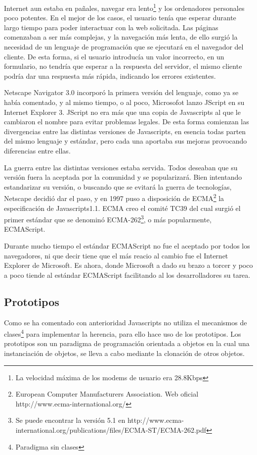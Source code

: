 Internet aun estaba en pañales, navegar era lento\footnote{La velocidad máxima de los modems de
  usuario era 28.8Kbps} y los ordenadores personales poco potentes. En el mejor de los casos, el
usuario tenía que esperar durante largo tiempo para poder interactuar con la web solicitada.  Las
páginas comenzaban a ser más complejas, y la navegación más lenta, de ello surgió la necesidad de
un lenguaje de programación que se ejecutará en el navegador del cliente. De esta forma, si el
usuario introducía un valor incorrecto, en un formulario, no tendría que esperar a la respuesta del
servidor, el mismo cliente podría dar una respuesta más rápida, indicando los errores existentes.

Netscape Navigator 3.0 incorporó la primera versión del lenguaje, como ya se había comentado, y al
mismo tiempo, o al poco, Microsofot lanzo JScript en su Internet Explorer 3. JScript no era más que 
una copia de Javascripts al que le cambiaron el nombre para evitar problemas legales. De esta
forma comienzan las divergencias entre las distintas versiones de Javascripts, en esencia todas
parten del mismo lenguaje y estándar, pero cada una aportaba sus mejoras provocando diferencias
entre ellas. 

La guerra entre las distintas versiones estaba servida. Todos deseaban que su versión fuera la
aceptada por la comunidad y se popularizará. Bien intentando estandarizar su versión, o buscando
que se evitará la guerra de tecnologías, Netscape decidió dar el paso, y en 1997 puso a disposición
de ECMA\footnote{European Computer Manufacturers Association. Web oficial
  http://www.ecma-international.org/} la especificación de Javascripts1.1. ECMA creo el comité TC39
del cual surgió el primer estándar que se denominó ECMA-262\footnote{Se puede encontrar la versión 5.1 en
  http://www.ecma-international.org/publications/files/ECMA-ST/ECMA-262.pdf}, o más popularmente, 
ECMAScript. 

Durante mucho tiempo el estándar ECMAScript no fue el aceptado por todos los navegadores, ni que
decir tiene que el más reacio al cambio fue el Internet Explorer de Microsoft. Es ahora, donde
Microsoft a dado su brazo a torcer y poco a poco tiende al estándar ECMAScript facilitando al los
desarrolladores su tarea.

\subsection{Prototipos}

Como se ha comentado con anterioridad Javascripts no utiliza el mecanismos de clases\footnote{Paradigma sin clases} para implementar la herencia, para ello hace uso de los prototipos. Los prototipos son un paradigma de programación orientada a objetos en la cual una instanciación de objetos, se lleva a cabo mediante la clonación de otros objetos. 

